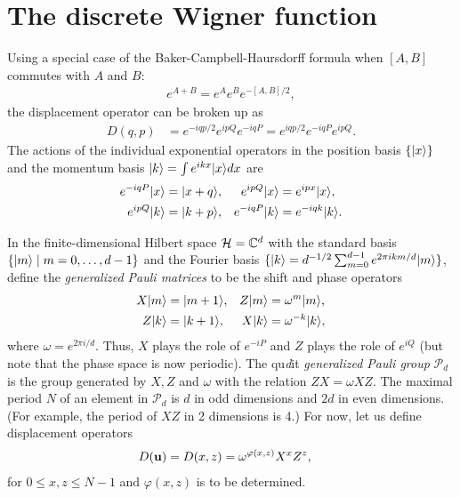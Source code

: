 \section{The discrete Wigner function}\label{ch4:discrete-wigner}

Using a special case of the Baker-Campbell-Haursdorff formula when $[A,B]$ commutes with $A$ and $B$:
\begin{align}
	e^{A+B} = e^A e^B e^{-[A,B]/2},
\end{align}
the displacement operator can be broken up as
\begin{align}
D(q,p) &= e^{-iqp/2} e^{ipQ} e^{-iqP} = e^{iqp/2} e^{-iqP} e^{ipQ}.
\end{align}
The actions of the individual exponential operators in the position basis $\{{\left\vert{x}\right\rangle}\}$ and the momentum basis ${\left\vert{k}\right\rangle} = \int e^{ikx} {\left\vert{x}\right\rangle} dx$ are
\begin{align}
e^{-iqP} {\left\vert{x}\right\rangle} &= {\left\vert{x+q}\right\rangle}, & e^{ipQ}{\left\vert{x}\right\rangle} &= e^{ipx}{\left\vert{x}\right\rangle}, \\
e^{ipQ}{\left\vert{k}\right\rangle} &= {\left\vert{k+p}\right\rangle}, & e^{-iqP} {\left\vert{k}\right\rangle} &= e^{-iqk}{\left\vert{k}\right\rangle}.
\end{align}

In the finite-dimensional Hilbert space $\mathcal{H} = \mathbb{C}^d$ with the standard basis $\{{\left\vert{m}\right\rangle}\mid m=0,\dots, d-1 \}$ and the Fourier basis $\{{\left\vert{k}\right\rangle} = d^{-1/2} \allowbreak \sum_{m=0}^{d-1} e^{2\pi ikm/d} {\left\vert{m}\right\rangle}\}$, define the \emph{generalized Pauli matrices} to be the shift and phase operators
\begin{align}
X\ket{m} &= \ket{m+1}, & Z\ket{m} &= \omega^m \ket{m}, \label{discrete-position-basis} \\
Z\ket{k} &= \ket{k+1}, & X\ket{k} &= \omega^{-k} \ket{k},
\end{align}
where $\omega = e^{2\pi i/d}$.
Thus, $X$ plays the role of $e^{-iP}$ and $Z$ plays the role of $e^{iQ}$ (but note that the phase space is now periodic). The qu\emph{d}it \emph{generalized Pauli group} $\mathcal{P}_d$ is the group generated by $X,Z$ and $\omega$ with the relation $ZX=\omega XZ$. The maximal period $N$ of an element in $\mathcal{P}_d$ is  $d$ in odd dimensions and $2d$ in even dimensions. (For example, the period of $XZ$ in 2 dimensions is 4.)  For now, let us define displacement operators
\begin{align}
	D({\bf u}) = D(x,z) &= \omega^{\varphi (x,z)} X^x Z^z,
\end{align}
for $0\le x,z \le N-1$ and $\varphi(x,z)$ is to be determined.

